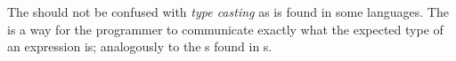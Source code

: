 \begin{aside}
The  should not be confused with \emph{type casting} as is found in some languages. The  is a way for the programmer to communicate exactly what the expected type of an expression is; analogously to the s found in s.
\end{aside}

%
%
%
%
%
%
%
